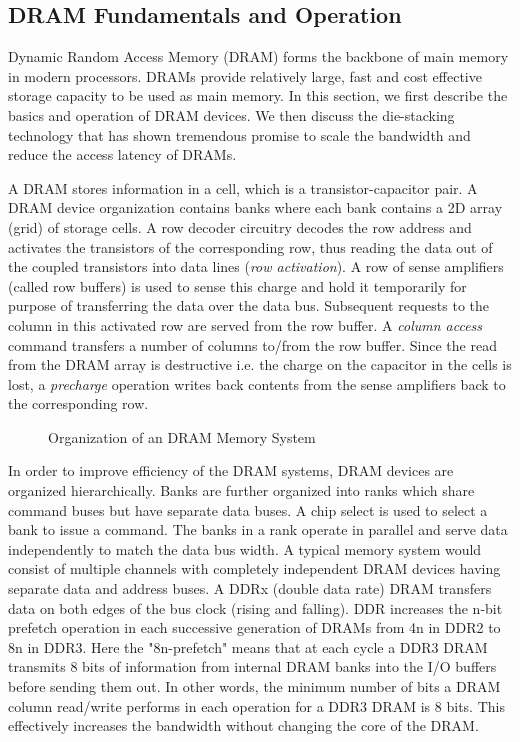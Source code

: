 \subsection{DRAM Fundamentals and Operation}
Dynamic Random Access Memory (DRAM) forms the backbone of main memory in modern processors. DRAMs provide relatively large, fast and cost effective storage capacity to be used as main memory. In this section, we first describe the basics and operation of DRAM  devices. We then discuss the die-stacking technology that has shown tremendous promise to scale the bandwidth and reduce the access latency of DRAMs.

A DRAM stores information in a cell, which is a transistor-capacitor pair. A DRAM device organization contains banks where each bank contains a 2D array (grid) of storage cells. A row decoder circuitry decodes the row address and activates the transistors of the corresponding row, thus reading the data out of the coupled transistors into data lines (\textit{row activation}). A row of sense amplifiers (called row buffers) is used to sense this charge and hold it temporarily for purpose of transferring the data over the data bus. Subsequent requests to the column in this activated row are served from the row buffer. A \textit{column access} command transfers a number of columns to/from the row buffer. Since the read from the DRAM array is destructive i.e. the charge on the capacitor in the cells is lost, a \textit{precharge} operation writes back contents from the sense amplifiers back to the corresponding row.
\begin{figure}[!htb]
	\centering
	\def\svgwidth{\columnwidth}
	
	\caption{Organization of an DRAM Memory System}
	\label{fig:dram-basics}
\end{figure}
\par In order to improve efficiency of the DRAM systems, DRAM devices are organized hierarchically. Banks are further organized into ranks which share command buses but have separate data buses. A chip select is used to select a bank to issue a command.  The banks in a rank operate in parallel and serve data independently to match the data bus width. A typical memory system would consist of multiple channels with completely independent DRAM devices having separate data and address buses. A DDRx (double data rate) DRAM transfers data on both edges of the bus clock (rising and falling). DDR increases the n-bit prefetch operation in each successive generation of DRAMs from 4n in DDR2 to 8n in DDR3. Here the "8n-prefetch" means that at each cycle a DDR3 DRAM transmits 8 bits of information from internal DRAM banks into the I/O buffers before sending them out. In other words, the minimum number of bits a DRAM column read/write performs in each operation for a DDR3 DRAM is 8 bits. This effectively increases the bandwidth without changing the core of the DRAM.
